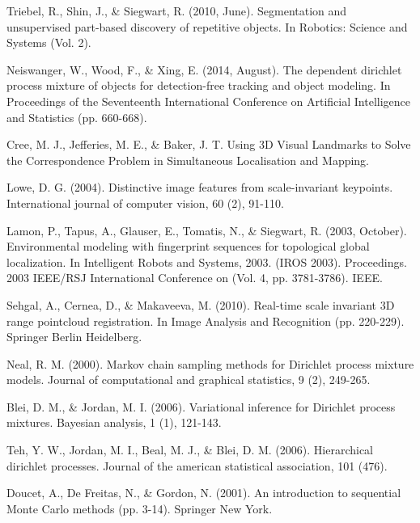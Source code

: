 \documentclass [twoside,hidelinks]{article}
\begin{document}
\begin{thebibliography}{9}
\newblock Triebel, R., Shin, J., \& Siegwart, R.  (2010, June). Segmentation and unsupervised part-based discovery of repetitive objects. In Robotics: Science and Systems  (Vol. 2).

\newblock Neiswanger, W., Wood, F., \& Xing, E.  (2014, August). The dependent dirichlet process mixture of objects for detection-free tracking and object modeling. In Proceedings of the Seventeenth International Conference on Artificial Intelligence and Statistics  (pp. 660-668).

\newblock Cree, M. J., Jefferies, M. E., \& Baker, J. T. Using 3D Visual Landmarks to Solve the Correspondence Problem in Simultaneous Localisation and Mapping.

\newblock Lowe, D. G.  (2004). Distinctive image features from scale-invariant keypoints. International journal of computer vision, 60 (2), 91-110.

\newblock Lamon, P., Tapus, A., Glauser, E., Tomatis, N., \& Siegwart, R.  (2003, October). Environmental modeling with fingerprint sequences for topological global localization. In Intelligent Robots and Systems, 2003. (IROS 2003). Proceedings. 2003 IEEE/RSJ International Conference on  (Vol. 4, pp. 3781-3786). IEEE.


\newblock Sehgal, A., Cernea, D., \& Makaveeva, M.  (2010). Real-time scale invariant 3D range pointcloud registration. In Image Analysis and Recognition  (pp. 220-229). Springer Berlin Heidelberg.

\newblock Neal, R. M.  (2000). Markov chain sampling methods for Dirichlet process mixture models. Journal of computational and graphical statistics, 9 (2), 249-265.

\newblock Blei, D. M., \& Jordan, M. I.  (2006). Variational inference for Dirichlet process mixtures. Bayesian analysis, 1 (1), 121-143.


\newblock Teh, Y. W., Jordan, M. I., Beal, M. J., \& Blei, D. M.  (2006). Hierarchical dirichlet processes. Journal of the american statistical association, 101 (476).

\newblock Doucet, A., De Freitas, N., \& Gordon, N.  (2001). An introduction to sequential Monte Carlo methods  (pp. 3-14). Springer New York.


\end{thebibliography}
\end{document}
